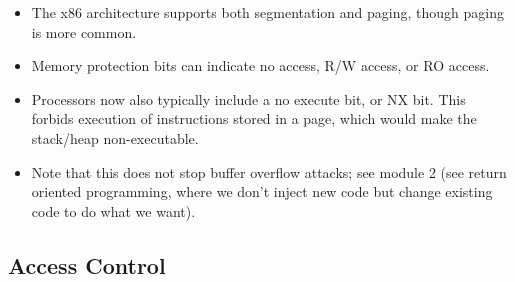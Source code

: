 \documentclass{article}
\begin{document}
\begin{itemize}
    \item The x86 architecture supports both segmentation and paging, though paging is more common.
    \item Memory protection bits can indicate no access, R/W access, or RO access.
    \item Processors now also typically include a no execute bit, or NX bit.  This forbids execution of instructions stored in a page, which would make the stack/heap non-executable.
    \item Note that this does not stop buffer overflow attacks; see module 2 (see return oriented programming, where we don't inject new code but change existing code to do what we want).
\end{itemize}

\subsection{Access Control}
\end{document}
